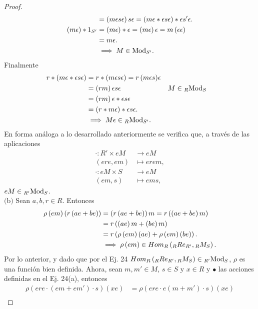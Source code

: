 \documentclass{article}
\newcommand{\lrprth}[1]{
	\left(#1\right)
}
\newcommand{\descapp}[6]{
	#1: #2 &\rightarrow #3\\
	#4 &\mapsto #5#6 
}
\newcommand{\ringmod}[3]{
	\if#3l
	{}_{#1}#2
	\else
	\if#3r
	#2_{#1}
	\fi
	\fi
}
\newcommand{\ringbimod}[4]{
	\if#4l
	{}_{#1-#2}#3
	\else
	\if#4r
	#3_{#1-#2}
	\else 
	\ifstrequal{#4}{lr}{
		{}_{#1}#3_{#2}
	}
	\fi
	\fi
}
\newcommand{\ringmodhom}[3]{
	Hom_{#1}\lrprth{#2,#3}
}
\theoremstyle{definition}
\theoremstyle{plain}
\theoremstyle{plain}
\theoremstyle{definition}
\theoremstyle{definition}
\theoremstyle{definition}
\theoremstyle{definition}
\theoremstyle{definition}
\theoremstyle{definition}
\begin{document}
\begin{enumerate}[label=\textbf{Ej \arabic*.}]
\begin{proof}
\begin{align*}
		&=\lrprth{m\epsilon s\epsilon}s\epsilon=\lrprth{m\epsilon*\epsilon s\epsilon}*\epsilon s'\epsilon.\\
		\lrprth{m\epsilon}*1_{S'}&=\lrprth{m\epsilon}*\epsilon=\lrprth{m\epsilon}\epsilon=m\lrprth{\epsilon\epsilon}\\&=m\epsilon.\\
		&\implies M\in\ringmod{S'}{\text{Mod}}{r}.\\		
	\end{align*}
	Finalmente
\begin{align*}
		{r*\lrprth{{m\epsilon}*{\epsilon s\epsilon}}}&=r*\lrprth{{m\epsilon s}\epsilon}={r\lrprth{m\epsilon s}}\epsilon\\
	&={\lrprth{rm}\epsilon s}\epsilon && M\in\ringbimod{R}{S}{\text{Mod}}{lr}\\
	&={\lrprth{rm}\epsilon}*{\epsilon s\epsilon}\\
	&=\lrprth{r*{m\epsilon}}*{\epsilon s\epsilon}.\\
	&\implies M\epsilon\in\ringbimod{R}{S'}{\text{Mod}}{lr}.
\end{align*}
	En forma análoga a lo desarrollado anteriormente se verifica que, a través de las aplicaciones
	\begin{align*}
		\descapp{\cdot}{R'\times eM}{eM}{(ere,em)}{e{rem}}{,}\\
		\descapp{\cdot}{eM\times S}{eM}{(em,s)}{e{ms}}{,}
	\end{align*}
	$eM\in\ringbimod{R'}{S}{\text{Mod}}{lr}$.\\
	$\boxed{\text{(b)}}$ Sean $a,b,r\in R$. Entonces
	\begin{align*}
		{\rho\lrprth{em}}\lrprth{r\lrprth{ae+be}}&=\lrprth{r\lrprth{ae+be}}m=r\lrprth{\lrprth{ae+be}m}\\
		&=r\lrprth{\lrprth{ae}m+\lrprth{be}m}\\
		&=r\lrprth{\rho\lrprth{em}(ae)+\rho\lrprth{em}(be)}.\\
		&\implies \rho\lrprth{em}\in\ringmodhom{R}{\ringbimod{R}{R'}{Re}{lr}}{\ringbimod{R}{S}{M}{lr}}.
	\end{align*}
	Por lo anterior, y dado que por el Ej. 24  $\ringmodhom{R}{\ringbimod{R}{R'}{Re}{lr}}{\ringbimod{R}{S}{M}{lr}}\in\ringbimod{R'}{S}{\text{Mod}}{lr}$, $\rho$ es una función bien definida. Ahora, sean $m,m'\in M$, $s\in S$ y $x\in R$ y $\bullet$ las acciones definidas en el Ej. 24(a), entonces 
	\begin{align*}
		\rho\lrprth{ere\cdot\lrprth{em+em'}\cdot s}\lrprth{xe}&=\rho\lrprth{{ere}\cdot{e{\lrprth{m+m'}}\cdot s}}(xe)\\

\end{align*}
\end{proof}
\end{enumerate}
\end{document}
